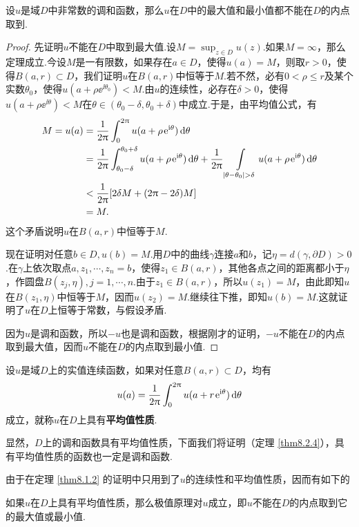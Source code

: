 \begin{theorem}\label{thm8.1.2}
设$u$是域$D$中非常数的调和函数，那么$u$在$D$中的最大值和最小值都不能在$D$的内点取到.
\end{theorem}
\begin{proof}
先证明$u$不能在$D$中取到最大值.设$M=\sup_{z\in D}u(z)$.如果$M=\infty$，那么定理成立.今设$M$是一有限数，如果存在$a\in D$，使得$u(a)=M$，则取$r>0$，使得$B(a,r)\subset D$，我们证明$u$在$B(a,r)$中恒等于$M$.若不然，必有$0<\rho\le r$及某个实数$\theta_0$，使得$u(a+\rho\ee^{\ii\theta_0})<M$.由$u$的连续性，必存在$\delta>0$，使得$u(a+\rho\ee^ {\ii\theta})<M$在$\theta\in(\theta_0-\delta,\theta_0+\delta)$中成立.于是，由平均值公式，有
\begin{align*}
M=u(a)&=\frac1{2\pi}\int_0^{2\pi}u(a+\rho\ee^{\ii\theta})\dif \theta\\
&=\frac1{2\pi}\int_{\theta_0-\delta}^{\theta_0+\delta}u(a+\rho\ee^{\ii\theta})
\dif \theta+\frac1{2\pi}\int\limits_{|\theta-\theta_0|>\delta}
u(a+\rho\ee^ {\ii\theta})\dif \theta\\
&<\frac1{2\pi}[2\delta M+(2\pi-2\delta)M]\\
&=M.
\end{align*}
这个矛盾说明$u$在$B(a,r)$中恒等于$M$.

现在证明对任意$b\in D,u(b)=M$.用$D$中的曲线$\gamma$连接$a$和$b$，记$\eta=d(\gamma,\partial D)>0$.在$\gamma$上依次取点$a,z_1,\cdots,z_n=b$，使得$z_1\in B(a,r)$，其他各点之间的距离都小于$\eta$，作圆盘$B(z_j,\eta),j=1,\cdots,n$.由于$z_1\in B(a,r)$，所以$u(z_1)=M$，由此即知$u$在$B(z_1,\eta)$中恒等于$M$，因而$u(z_2)=M$.继续往下推，即知$u(b)=M$.这就证明了$u$在$D$上恒等于常数，与假设矛盾.

因为$u$是调和函数，所以$-u$也是调和函数，根据刚才的证明，$-u$不能在$D$的内点取到最大值，因而$u$不能在$D$的内点取到最小值.
\end{proof}

\begin{definition}\label{def8.1.3}
设$u$是域$D$上的实值连续函数，如果对任意$B(a,r)\subset D$，均有
\[u(a)=\frac1{2\uppi}\int_0^{2\uppi}u(a+r\operatorname{\!\!\;\mathrm e}^{\mathrm i\theta})\mathop{}\!\mathrm{d} \theta\]
成立，就称$u$在$D$上具有\textbf{平均值性质}.
\end{definition}

显然，$D$上的调和函数具有平均值性质，下面我们将证明（定理 \ref{thm8.2.4}），具有平均值性质的函数也一定是调和函数.

由于在定理 \ref{thm8.1.2} 的证明中只用到了$u$的连续性和平均值性质，因而有如下的
\begin{prop}\label{prop8.1.4}
如果$u$在$D$上具有平均值性质，那么极值原理对$u$成立，即$u$不能在$D$的内点取到它的最大值或最小值.
\end{prop}

